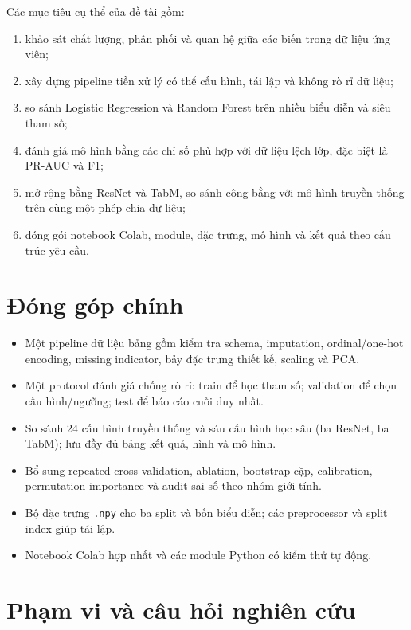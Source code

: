 \documentclass[12pt,a4paper,oneside]{report}
\newcommand{\code}[1]{\texttt{#1}}
\begin{document}
Các mục tiêu cụ thể của đề tài gồm:

\begin{enumerate}
  \item khảo sát chất lượng, phân phối và quan hệ giữa các biến trong dữ liệu ứng viên;
  \item xây dựng pipeline tiền xử lý có thể cấu hình, tái lập và không rò rỉ dữ liệu;
  \item so sánh Logistic Regression và Random Forest trên nhiều biểu diễn và siêu tham số;
  \item đánh giá mô hình bằng các chỉ số phù hợp với dữ liệu lệch lớp, đặc biệt là PR-AUC và F1;
  \item mở rộng bằng ResNet và TabM, so sánh công bằng với mô hình truyền thống trên cùng một phép chia dữ liệu;
  \item đóng gói notebook Colab, module, đặc trưng, mô hình và kết quả theo cấu trúc yêu cầu.
\end{enumerate}

\section{Đóng góp chính}

\begin{itemize}
  \item Một pipeline dữ liệu bảng gồm kiểm tra schema, imputation, ordinal/one-hot encoding, missing indicator, bảy đặc trưng thiết kế, scaling và PCA.
  \item Một protocol đánh giá chống rò rỉ: train để học tham số; validation để chọn cấu hình/ngưỡng; test để báo cáo cuối duy nhất.
  \item So sánh 24 cấu hình truyền thống và sáu cấu hình học sâu (ba ResNet, ba TabM); lưu đầy đủ bảng kết quả, hình và mô hình.
  \item Bổ sung repeated cross-validation, ablation, bootstrap cặp, calibration, permutation importance và audit sai số theo nhóm giới tính.
  \item Bộ đặc trưng \code{.npy} cho ba split và bốn biểu diễn; các preprocessor và split index giúp tái lập.
  \item Notebook Colab hợp nhất và các module Python có kiểm thử tự động.
\end{itemize}

\section{Phạm vi và câu hỏi nghiên cứu}
\end{document}
